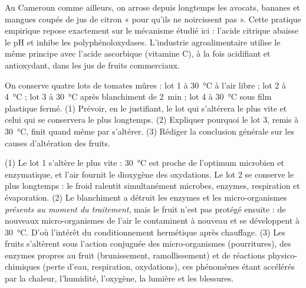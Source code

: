 \documentclass[11pt]{article}
\begin{document}
\begin{savaistu}
Au Cameroun comme ailleurs, on arrose depuis longtemps les avocats, bananes et mangues coupés de jus de citron « pour qu'ils ne noircissent pas ». Cette pratique empirique repose exactement sur le mécanisme étudié ici : l'acide citrique abaisse le pH et inhibe les polyphénoloxydases. L'industrie agroalimentaire utilise le même principe avec l'acide ascorbique (vitamine C), à la fois acidifiant et antioxydant, dans les jus de fruits commerciaux.
\end{savaistu}

\begin{exercice}
On conserve quatre lots de tomates mûres : lot 1 à \SI{30}{\celsius} à l'air libre ; lot 2 à \SI{4}{\celsius} ; lot 3 à \SI{30}{\celsius} après blanchiment de \SI{2}{min} ; lot 4 à \SI{30}{\celsius} sous film plastique fermé. (1) Prévoir, en le justifiant, le lot qui s'altérera le plus vite et celui qui se conservera le plus longtemps. (2) Expliquer pourquoi le lot 3, remis à \SI{30}{\celsius}, finit quand même par s'altérer. (3) Rédiger la conclusion générale sur les causes d'altération des fruits.
\end{exercice}

\begin{corrige}[Exercice]
(1) Le lot 1 s'altère le plus vite : \SI{30}{\celsius} est proche de l'optimum microbien et enzymatique, et l'air fournit le dioxygène des oxydations. Le lot 2 se conserve le plus longtemps : le froid ralentit simultanément microbes, enzymes, respiration et évaporation.
(2) Le blanchiment a détruit les enzymes et les micro-organismes \emph{présents au moment du traitement}, mais le fruit n'est pas protégé ensuite : de nouveaux micro-organismes de l'air le contaminent à nouveau et se développent à \SI{30}{\celsius}. D'où l'intérêt du conditionnement hermétique après chauffage.
(3) Les fruits s'altèrent sous l'action conjuguée des micro-organismes (pourritures), des enzymes propres au fruit (brunissement, ramollissement) et de réactions physico-chimiques (perte d'eau, respiration, oxydations), ces phénomènes étant accélérés par la chaleur, l'humidité, l'oxygène, la lumière et les blessures.
\end{corrige}
\end{document}
